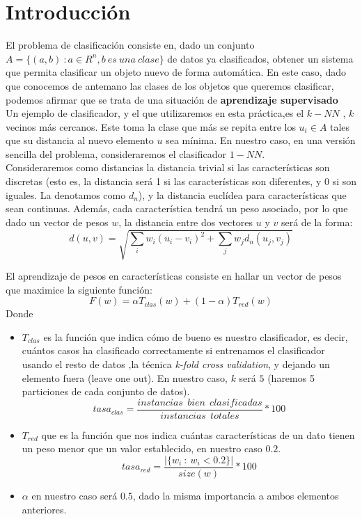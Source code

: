 \documentclass[11pt]{article}
\begin{document}
\section{Introducción}
El problema de clasificación consiste en, dado un conjunto $A=\{(a,b) \ : a \in R^n, b \ es \ una \ clase\}$ de datos ya clasificados, obtener un sistema que permita clasificar un objeto nuevo de forma automática. En este caso, dado que conocemos de antemano las clases de los objetos que queremos clasificar, podemos afirmar que se trata de una situación de \textbf{aprendizaje supervisado}\\

 Un ejemplo de clasificador, y el que utilizaremos en esta práctica,es el $k-NN$ , $k$ vecinos más cercanos. Este toma la clase que más se repita entre los $u_i\in A$ tales que su distancia al nuevo elemento $u$ sea mínima. En nuestro caso, en una versión sencilla del problema, consideraremos el clasificador $1-NN$. \\

Consideraremos como distancias la distancia trivial si las características son discretas (esto es, la distancia será 1 si las características son diferentes, y 0 si son iguales. La denotamos como $d_n$), y la distancia euclídea para características que sean continuas. Además, cada característica tendrá un peso asociado, por lo que dado un vector de pesos $w$, la distancia entre dos vectores $u$ y $v$ será de la forma:
\[
d(u,v) = \sqrt {\sum_i w_i(u_i- v_i)^2 + \sum_j w_j d_n(u_j,v_j)}
\]

 El aprendizaje de pesos en características consiste  en hallar un vector de pesos que maximice la siguiente función:
\[
F(w) = \alpha T_{clas}(w) + (1-\alpha)T_{red}(w)
\]
Donde
\begin{itemize}
\item $T_{clas}$ es la función que indica cómo de bueno es nuestro clasificador, es decir, cuántos casos ha clasificado correctamente si entrenamos el clasificador usando el resto de datos ,la técnica \emph{k-fold cross validation}, y dejando un elemento fuera (leave one out). En nuestro caso, $k$ será $5$ (haremos 5 particiones de cada conjunto de datos).
\[
tasa_{clas} = \frac{instancias \ \ bien \ \ clasificadas}{instancias \ \ totales} *100
\]
	\item $T_{red}$ que es la función que nos indica cuántas características de un dato tienen un peso menor que un valor establecido, en nuestro caso $0.2$.
	\[
	tasa_{red} = \frac{|\{w_i \ : \ w_i < 0.2\}|}{size(w)}*100
	\]
	
	\item $\alpha$ en nuestro caso será $0.5$, dado la misma importancia a ambos elementos anteriores.
\end{itemize}
\end{document}
